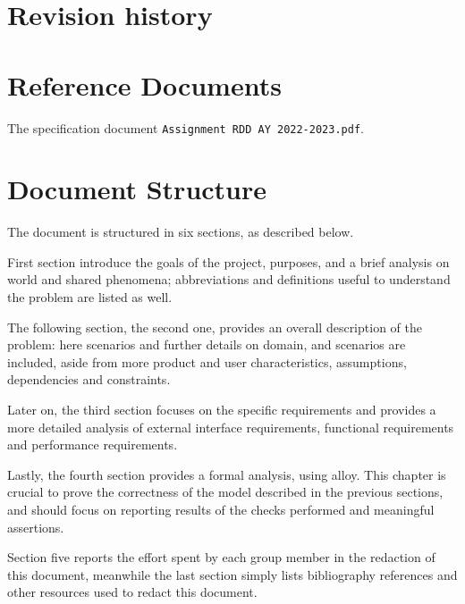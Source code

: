 \section{Revision history}
\label{sec:revision_history}%


\section{Reference Documents}
\label{sec:reference_documents}%
The specification document \verb|Assignment RDD AY 2022-2023.pdf|.


\section{Document Structure}
\label{sec:document_structure}%
The document is structured in six sections, as described below.

First section introduce the goals of the project, purposes, and a brief analysis on world and shared phenomena;
abbreviations and definitions useful to understand the problem are listed as well.

The following section, the second one, provides an overall description of the problem: here scenarios and further
details on domain, and scenarios are included, aside from more product and user characteristics, assumptions,
dependencies and constraints.

Later on, the third section focuses on the specific requirements and provides a more detailed analysis of external
interface requirements, functional requirements and performance requirements.

Lastly, the fourth section provides a formal analysis, using alloy.
This chapter is crucial to prove the correctness of the model described in the previous sections, and should focus on
reporting results of the checks performed and meaningful assertions.

Section five reports the effort spent by each group member in the redaction of this document, meanwhile the last
section simply lists bibliography references and other resources used to redact this document.
